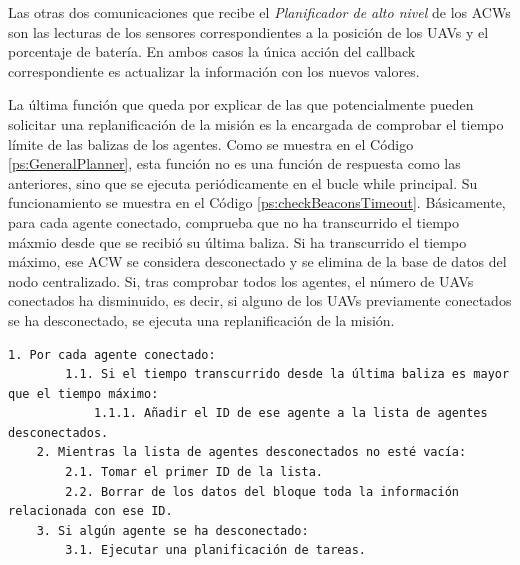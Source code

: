 \documentclass[fontsize=11pt, English=false, Español=true, Myfinal=true, twoside, numbers=noenddot]{scrbook}
\begin{document}
Las otras dos comunicaciones que recibe el \emph{Planificador de alto nivel} de los \glspl{ACW} son las lecturas de los sensores correspondientes a la posición de los \glspl{UAV} y el porcentaje de batería. En ambos casos la única acción del callback correspondiente es actualizar la información con los nuevos valores.

La última función que queda por explicar de las que potencialmente pueden solicitar una replanificación de la misión es la encargada de comprobar el tiempo límite de las balizas de los agentes. Como se muestra en el Código \ref{ps:GeneralPlanner}, esta función no es una función de respuesta como las anteriores, sino que se ejecuta periódicamente en el bucle while principal. Su funcionamiento se muestra en el Código \ref{ps:checkBeaconsTimeout}. Básicamente, para cada agente conectado, comprueba que no ha transcurrido el tiempo máxmio desde que se recibió su última baliza. Si ha transcurrido el tiempo máximo, ese \gls{ACW} se considera desconectado y se elimina de la base de datos del nodo centralizado. Si, tras comprobar todos los agentes, el número de \glspl{UAV} conectados ha disminuido, es decir, si alguno de los \glspl{UAV} previamente conectados se ha desconectado, se ejecuta una replanificación de la misión.

\begin{lstlisting}[caption={Función que comprueba el tiempo límite de las balizas de los agentes}, breaklines=true, label=ps:checkBeaconsTimeout]
	1. Por cada agente conectado:
		1.1. Si el tiempo transcurrido desde la última baliza es mayor que el tiempo máximo:
			1.1.1. Añadir el ID de ese agente a la lista de agentes desconectados.
	2. Mientras la lista de agentes desconectados no esté vacía:
		2.1. Tomar el primer ID de la lista.
		2.2. Borrar de los datos del bloque toda la información relacionada con ese ID.
	3. Si algún agente se ha desconectado:
		3.1. Ejecutar una planificación de tareas.
\end{lstlisting}
\end{document}
